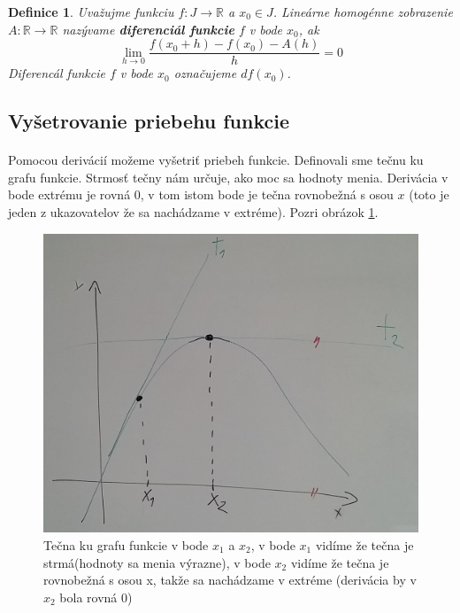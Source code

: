 \documentclass[12pt,a4paper]{article}
\newtheorem{definition}{Definice}
\begin{document}
\begin{definition}
	Uvažujme funkciu $f:J\rightarrow \mathds{R}$ a $x_{0}\in J$. Lineárne homogénne zobrazenie $A:\mathds{R}\rightarrow \mathds{R}$ nazývame \textbf{diferenciál funkcie} $f$ v bode $x_{0}$, ak $$\lim_{h\rightarrow 0}\frac{f(x_{0}+h) - f(x_{0})-A(h)}{h}=0$$ Diferencál funkcie $f$ v bode $x_{0}$ označujeme $df(x_{0})$.
\end{definition}

\subsection{Vyšetrovanie priebehu funkcie}
\paragraph{}
Pomocou derivácií možeme vyšetriť priebeh funkcie. Definovali sme tečnu ku grafu funkcie. Strmosť tečny nám určuje, ako moc sa hodnoty menia. Derivácia v bode extrému je rovná 0, v tom istom bode je tečna rovnobežná s osou $x$ (toto je jeden z ukazovatelov že sa nachádzame v extréme). Pozri obrázok \ref{tecna}.

\begin{figure}[ht]
	\begin{center}
		\includegraphics[scale=0.24]{img/tecna}
	\end{center}
	\caption{Tečna ku grafu funkcie v bode $x_{1}$ a $x_{2}$, v bode $x_{1}$ vidíme že tečna je strmá(hodnoty sa menia výrazne), v bode $x_{2}$ vidíme že tečna je rovnobežná s osou x, takže sa nachádzame v extréme (derivácia by v $x_{2}$ bola rovná 0)\label{tecna}}
\end{figure}
\end{document}
